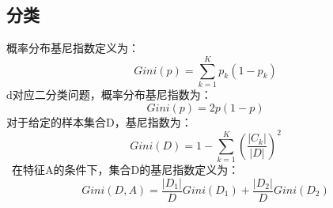 \documentclass{article}
\begin{document}
	\subsection{分类}
	概率分布基尼指数定义为：
	\begin{equation}
	Gini(p)=\sum_{k=1}^{K}p_{k}(1-p_{k})
	\end{equation}
	d对应二分类问题，概率分布基尼指数为：
	\begin{equation}
	Gini(p)=2p(1-p)
	\end{equation}
	对于给定的样本集合D，基尼指数为：
	\begin{equation}
	Gini(D)=1-\sum_{k=1}^{K}\left ( \frac{\left | C_{k} \right |}{\left | D \right |} \right )^{2}
	\end{equation}\
	在特征A的条件下，集合D的基尼指数定义为：
	\begin{equation}
	Gini(D,A)=\frac{\left | D_{1} \right |}{D}Gini\left ( D_{1} \right )+\frac{\left | D_{2} \right |}{D}Gini\left ( D_{2} \right )
	\end{equation}
\end{document}
